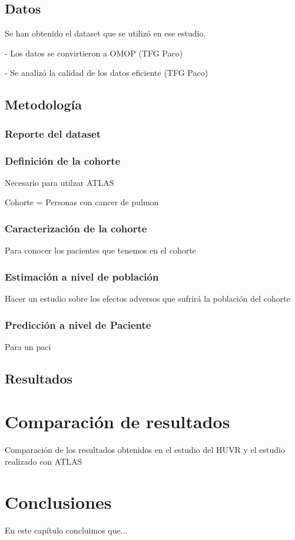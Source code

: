 
\subsection{Datos}

Se han obtenido el dataset que se utilizó en ese estudio.

- Los datos se convirtieron a OMOP (TFG Paco)

- Se analizó la calidad de los datos eficiente (TFG Paco)

\subsection{Metodología}

\subsubsection{Reporte del dataset}

\subsubsection{Definición de la cohorte}

Necesario para utilzar ATLAS

Cohorte = Personas con cancer de pulmon

\subsubsection{Caracterización de la cohorte}

Para conocer los pacientes que tenemos en el cohorte

\subsubsection{Estimación a nivel de población}

Hacer un estudio sobre los efectos adversos que sufrirá la población del cohorte

\subsubsection{Predicción a nivel de Paciente}

Para un paci

\subsection{Resultados}


\section{Comparación de resultados}

Comparación de los resultados obtenidos en el estudio del HUVR y el estudio realizado con ATLAS


\section{Conclusiones}

En este capítulo concluimos que...